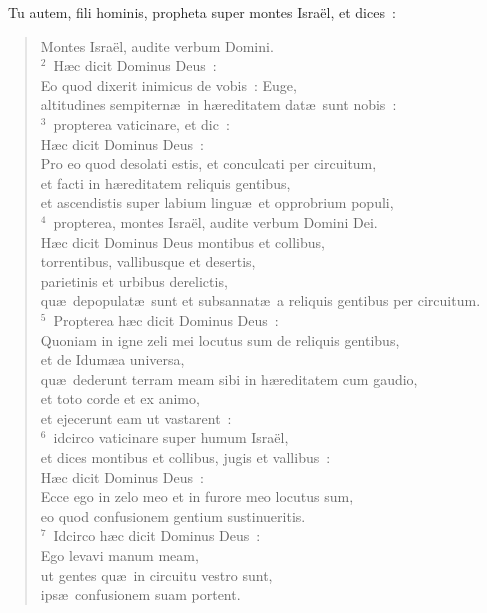~Tu autem, fili hominis, propheta super montes Isra\"el, et dices~: \begin{flushleft}\begin{verse}\vspace{6pt}Montes Isra\"el, audite verbum Domini.\\
${}^{2}$~H\ae c dicit Dominus Deus~:\\ Eo quod dixerit inimicus de vobis~: Euge,\\ altitudines sempitern\ae\ in h\ae reditatem dat\ae\ sunt nobis~:\\
${}^{3}$~propterea vaticinare, et dic~:\\ H\ae c dicit Dominus Deus~:\\ Pro eo quod desolati estis, et conculcati per circuitum,\\ et facti in h\ae reditatem reliquis gentibus,\\ et ascendistis super labium lingu\ae\ et opprobrium populi,\\
${}^{4}$~propterea, montes Isra\"el, audite verbum Domini Dei.\\ H\ae c dicit Dominus Deus montibus et collibus,\\ torrentibus, vallibusque et desertis,\\ parietinis et urbibus derelictis,\\ qu\ae\ depopulat\ae\ sunt et subsannat\ae\ a reliquis gentibus per circuitum.\\
${}^{5}$~Propterea h\ae c dicit Dominus Deus~:\\ Quoniam in igne zeli mei locutus sum de reliquis gentibus,\\ et de Idum\ae a universa,\\ qu\ae\ dederunt terram meam sibi in h\ae reditatem cum gaudio,\\ et toto corde et ex animo,\\ et ejecerunt eam ut vastarent~:\\
${}^{6}$~idcirco vaticinare super humum Isra\"el,\\ et dices montibus et collibus, jugis et vallibus~:\\ H\ae c dicit Dominus Deus~:\\ Ecce ego in zelo meo et in furore meo locutus sum,\\ eo quod confusionem gentium sustinueritis.\\
${}^{7}$~Idcirco h\ae c dicit Dominus Deus~:\\ Ego levavi manum meam,\\ ut gentes qu\ae\ in circuitu vestro sunt,\\ ips\ae\ confusionem suam portent.\\

\end{verse}
\end{flushleft}
